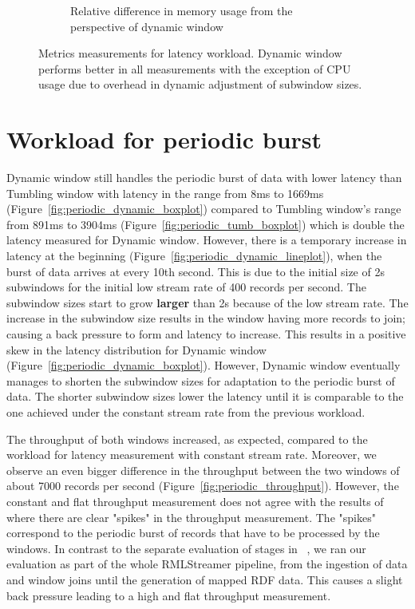 \begin{figure}
\begin{subfigure}[b]{\columnwidth}
        \caption{Relative difference in memory usage from the perspective of dynamic window}
        \label{fig:constant_mem_diff}
    \end{subfigure}

    \caption[Metrics measurements for latency workload.]
    {Metrics measurements for latency workload. Dynamic window performs 
    better in all measurements with the exception of CPU usage due to
overhead in dynamic adjustment of subwindow sizes.}%
    \label{fig:constant_measurement}
\end{figure}

\newpage
\section{Workload for periodic burst}%
\label{sec:Results Workload for periodic burst}

Dynamic window still handles the periodic burst of data with lower latency 
than Tumbling window with latency in the range from 8ms to 1669ms
(Figure~\ref{fig:periodic_dynamic_boxplot}) compared to 
Tumbling window's range from 891ms to 3904ms 
(Figure~\ref{fig:periodic_tumb_boxplot}) which is double the latency 
measured for Dynamic window.
However, there is a temporary increase in latency at the beginning 
(Figure~\ref{fig:periodic_dynamic_lineplot}), 
when the burst of data arrives at every 10th second. 
This is due to the initial size of 2s subwindows for the initial low stream rate of 400 records per second. 
The subwindow sizes start to grow \textbf{larger} than 2s because of the low stream rate. 
The increase in the subwindow size results in the 
window having more records to join; causing a back pressure to form and latency to increase.  
This results in a positive skew in the latency distribution for Dynamic window (Figure~\ref{fig:periodic_dynamic_boxplot}). 
However, Dynamic window eventually manages to shorten the subwindow sizes for adaptation to the periodic burst of data.
The shorter subwindow sizes lower the latency until it is comparable to the one achieved under the constant stream rate from the 
previous workload.


The throughput of both windows increased, as expected, compared to the workload for latency measurement 
with constant stream rate. Moreover, we observe an even bigger difference in the throughput between the 
two windows of about 7000 records per second 
(Figure~\ref{fig:periodic_throughput}). However, the
constant and flat throughput measurement does not agree 
with the results of ~\cite{evalution_of_spe} where there are clear "spikes" in 
the throughput measurement. The "spikes" correspond to the periodic burst 
of records that have to be processed by the windows. 
In contrast to the separate evaluation of stages in ~\cite{evalution_of_spe}, 
we ran our evaluation as part of the whole RMLStreamer pipeline, from the 
ingestion of data and window joins until the generation of mapped RDF data.
This causes a slight back pressure 
leading to a high and flat throughput measurement. 

